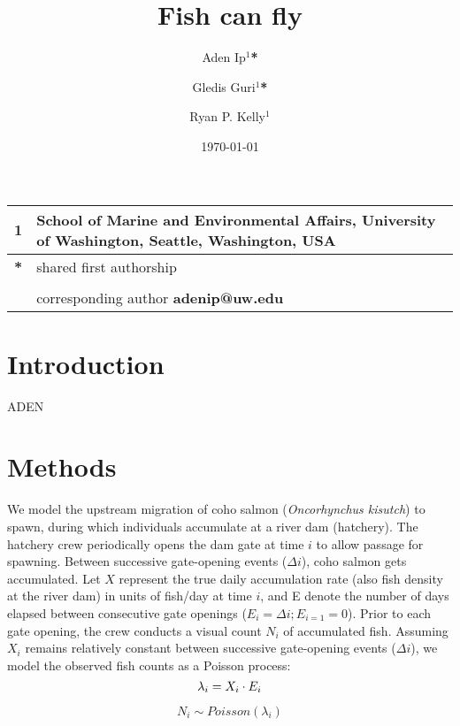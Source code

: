 \documentclass{article}
\title{Fish can fly}
\author{Aden Ip$^1$\textbf{*} \and
Gledis Guri$^1$\textbf{*} \and
Ryan P. Kelly$^1$}
\date{\today}
\begin{document}
\maketitle

\section*{}

\begin{center}
\begin{tabular}{ll}
1 & School of Marine and Environmental Affairs, University of Washington, Seattle, Washington, USA \\
\hline
\textbf{*} & shared first authorship\\
&\\
& corresponding author \textbf{adenip@uw.edu}
\end{tabular}
\end{center}

\section{Introduction}
ADEN
\section{Methods}

We model the upstream migration of coho salmon (\textit{Oncorhynchus kisutch}) to spawn, during which individuals accumulate at a river dam (hatchery). The hatchery crew periodically opens the dam gate at time $i$ to allow passage for spawning. Between successive gate-opening events ($\Delta i$), coho salmon gets accumulated. Let $X$ represent the true daily accumulation rate (also fish density at the river dam) in units of fish/day at time $i$, and E denote the number of days elapsed between consecutive gate openings ($ E_i =\Delta i; E_{i=1} = 0$). Prior to each gate opening, the crew conducts a visual count $N_i$ of accumulated fish.
Assuming $X_i$ remains relatively constant between successive gate-opening events ($\Delta i$), we model the observed fish counts as a Poisson process:
\begin{equation}
\lambda_i = X_i \cdot E_i \\
\end{equation}

\begin{equation}
N_i \sim Poisson(\lambda_i)
\end{equation}
\end{document}
